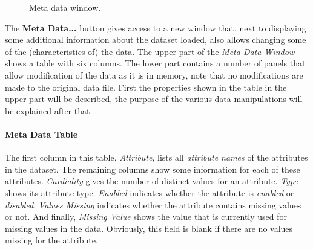 \documentclass{article}
\begin{document}
\begin{figure}
\begin{center}
\centering
{}
\caption{Meta data window.}
\end{center}
\label{fig:metadatawindow}
\end{figure}

The \textbf{Meta Data...} button gives access to a new window that, next to displaying some additional information about the dataset loaded, also allows changing some of the (characteristics of) the data.
The upper part of the \emph{Meta Data Window} shows a table with six columns.
The lower part contains a number of panels that allow modification of the data as it is in memory, note that no modifications are made to the original data file.
First the properties shown in the table in the upper part will be described, the purpose of the various data manipulations will be explained after that.

\paragraph{Meta Data Table}
\label{meta-data-window:meta-data-table}

The first column in this table, \emph{Attribute}, lists all \emph{attribute names} of the attributes in the dataset.
The remaining columns show some information for each of these attributes.
\emph{Cardiality} gives the number of distinct values for an attribute.
\emph{Type} shows its attribute type.
\emph{Enabled} indicates whether the attribute is \emph{enabled} or \emph{disabled}.
\emph{Values Missing} indicates whether the attribute contains missing values or not.
And finally, \emph{Missing Value} shows the value that is currently used for missing values in the data.
Obviously, this field is blank if there are no values missing for the attribute.
\end{document}
